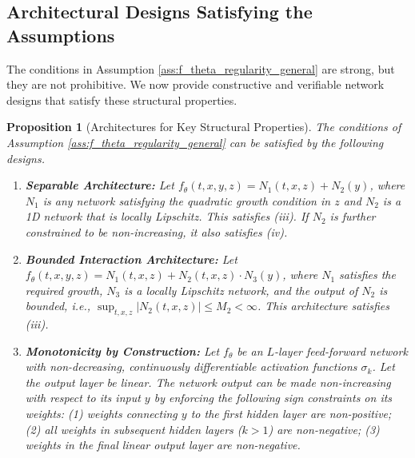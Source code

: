 \documentclass[qian]{imsart}
\newcommand{\abs}[1]{\left\lvert#1\right\rvert}
\theoremstyle{plain}
\newtheorem{proposition}[theorem]{Proposition}
\theoremstyle{definition}
\begin{document}
\subsection{Architectural Designs Satisfying the Assumptions}

The conditions in Assumption \ref{ass:f_theta_regularity_general} are strong, but they are not prohibitive. We now provide constructive and verifiable network designs that satisfy these structural properties.

\begin{proposition}[Architectures for Key Structural Properties]
\label{prop:architectures}
The conditions of Assumption \ref{ass:f_theta_regularity_general} can be satisfied by the following designs.
\begin{enumerate}[label=(\alph*)]
    \item \textbf{Separable Architecture:} Let $f_\theta(t,x,y,z) = N_1(t,x,z) + N_2(y)$, where $N_1$ is any network satisfying the quadratic growth condition in $z$ and $N_2$ is a 1D network that is locally Lipschitz. This satisfies (iii). If $N_2$ is further constrained to be non-increasing, it also satisfies (iv).

    \item \textbf{Bounded Interaction Architecture:} Let $f_\theta(t,x,y,z) = N_1(t,x,z) + N_2(t,x,z) \cdot N_3(y)$, where $N_1$ satisfies the required growth, $N_3$ is a locally Lipschitz network, and the output of $N_2$ is bounded, i.e., $\sup_{t,x,z} \abs{N_2(t,x,z)} \le M_2 < \infty$. This architecture satisfies (iii).

    \item \textbf{Monotonicity by Construction:} Let $f_\theta$ be an $L$-layer feed-forward network with non-decreasing, continuously differentiable activation functions $\sigma_k$. Let the output layer be linear. The network output can be made non-increasing with respect to its input $y$ by enforcing the following sign constraints on its weights: (1) weights connecting $y$ to the first hidden layer are non-positive; (2) all weights in subsequent hidden layers ($k>1$) are non-negative; (3) weights in the final linear output layer are non-negative.
\end{enumerate}
\end{proposition}
\end{document}
